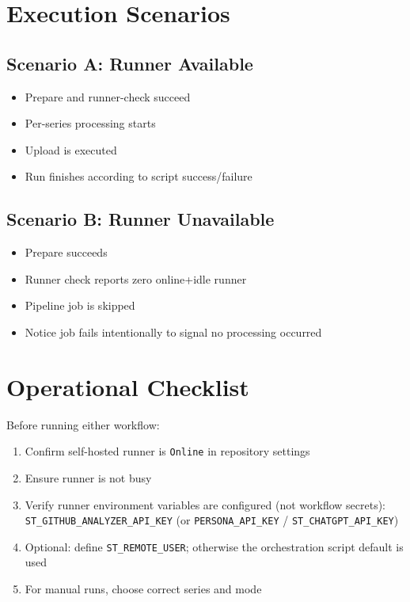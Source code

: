 \documentclass[11pt,a4paper]{article}
\begin{document}
\section{Execution Scenarios}
\subsection{Scenario A: Runner Available}
\begin{itemize}
  \item Prepare and runner-check succeed
  \item Per-series processing starts
  \item Upload is executed
  \item Run finishes according to script success/failure
\end{itemize}

\subsection{Scenario B: Runner Unavailable}
\begin{itemize}
  \item Prepare succeeds
  \item Runner check reports zero online+idle runner
  \item Pipeline job is skipped
  \item Notice job fails intentionally to signal no processing occurred
\end{itemize}

\section{Operational Checklist}
Before running either workflow:
\begin{enumerate}
  \item Confirm self-hosted runner is \texttt{Online} in repository settings
  \item Ensure runner is not busy
  \item Verify runner environment variables are configured (not workflow secrets):\\
  \texttt{ST\_GITHUB\_ANALYZER\_API\_KEY} (or \texttt{PERSONA\_API\_KEY} / \texttt{ST\_CHATGPT\_API\_KEY})
  \item Optional: define \texttt{ST\_REMOTE\_USER}; otherwise the orchestration script default is used
  \item For manual runs, choose correct series and mode
\end{enumerate}
\end{document}
